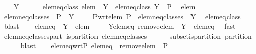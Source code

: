 \begin{isabellebody}
\ \ \isamarkupfalse%
\ Y\ \isanewline
\ \ \ \ \ elem{\isacharunderscore}eq{\isacharunderscore}class{\isacharcolon}\ {\isachardoublequoteopen}elem\ {\isasymin}\ Y{\isachardoublequoteclose}\ \ elem{\isacharunderscore}eq{\isacharunderscore}class{\isacharprime}{\isacharcolon}\ {\isachardoublequoteopen}Y\ {\isasymin}\ P{\isachardoublequoteclose}\ \isamarkupfalse%
\ elem\ \isacommand{{\isachardot}{\isachardot}}\isamarkupfalse%
\isanewline
\ \ \isamarkupfalse%
\ {\isacharquery}elem{\isacharunderscore}neq{\isacharunderscore}classes\ {\isacharequal}\ {\isachardoublequoteopen}P\ {\isacharminus}\ {\isacharbraceleft}Y{\isacharbraceright}{\isachardoublequoteclose}\ \isanewline
\ \ \isamarkupfalse%
\ P{\isacharunderscore}wrt{\isacharunderscore}elem{\isacharcolon}\ {\isachardoublequoteopen}P\ {\isacharequal}\ {\isacharquery}elem{\isacharunderscore}neq{\isacharunderscore}classes\ {\isasymunion}\ {\isacharbraceleft}Y{\isacharbraceright}{\isachardoublequoteclose}\ \isamarkupfalse%
\ elem{\isacharunderscore}eq{\isacharunderscore}class{\isacharprime}\ \isamarkupfalse%
\ blast\isanewline
\ \ \isamarkupfalse%
\ {\isacharquery}elem{\isacharunderscore}eq\ {\isacharequal}\ {\isachardoublequoteopen}Y\ {\isacharminus}\ {\isacharbraceleft}elem{\isacharbraceright}{\isachardoublequoteclose}\ \isanewline
\ \ \isamarkupfalse%
\ Y{\isacharunderscore}elem{\isacharunderscore}eq{\isacharcolon}\ {\isachardoublequoteopen}{\isacharquery}remove{\isacharunderscore}elem\ {\isacharbackquote}\ {\isacharbraceleft}Y{\isacharbraceright}\ {\isacharequal}\ {\isacharbraceleft}{\isacharquery}elem{\isacharunderscore}eq{\isacharbraceright}{\isachardoublequoteclose}\ \isamarkupfalse%
\ fast\isanewline
\ \ \isanewline
\ \ \isamarkupfalse%
\ elem{\isacharunderscore}neq{\isacharunderscore}classes{\isacharunderscore}part{\isacharcolon}\ {\isachardoublequoteopen}is{\isacharunderscore}partition\ {\isacharquery}elem{\isacharunderscore}neq{\isacharunderscore}classes{\isachardoublequoteclose}\isanewline
\ \ \ \ \isamarkupfalse%
\ subset{\isacharunderscore}is{\isacharunderscore}partition\ partition\isanewline
\ \ \ \ \isamarkupfalse%
\ blast\isanewline
\ \ \isamarkupfalse%
\ elem{\isacharunderscore}eq{\isacharunderscore}wrt{\isacharunderscore}P{\isacharcolon}\ {\isachardoublequoteopen}{\isacharquery}elem{\isacharunderscore}eq\ {\isasymin}\ {\isacharquery}remove{\isacharunderscore}elem\ {\isacharbackquote}\ P{\isachardoublequoteclose}\ \isamarkupfalse%

\end{isabellebody}

